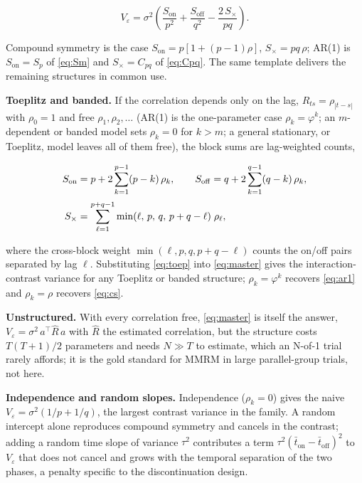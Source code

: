 \documentclass[
  11pt,
]{article}
\begin{document}
\begin{equation}
V_\varepsilon = \sigma^2\!\left(\frac{S_{\mathrm{on}}}{p^2}
  + \frac{S_{\mathrm{off}}}{q^2}
  - \frac{2\, S_{\times}}{pq}\right).
\label{eq:master}
\end{equation}

Compound symmetry is the case \(S_{\mathrm{on}} = p[1 + (p-1)\rho]\),
\(S_{\times} = pq\,\rho\); AR(1) is \(S_{\mathrm{on}} = S_p\) of
\eqref{eq:Sm} and \(S_{\times} = C_{pq}\) of \eqref{eq:Cpq}. The same
template delivers the remaining structures in common use.

\textbf{Toeplitz and banded.} If the correlation depends only on the lag,
\(R_{ts} = \rho_{|t-s|}\) with \(\rho_0 = 1\) and free \(\rho_1, \rho_2,
\dots\) (AR(1) is the one-parameter case \(\rho_k = \varphi^k\); an
\(m\)-dependent or banded model sets \(\rho_k = 0\) for \(k > m\); a general
stationary, or Toeplitz, model leaves all of them free), the block
sums are lag-weighted counts,

\begin{align}
S_{\mathrm{on}} &= p + 2\sum_{k=1}^{p-1}(p-k)\,\rho_k,
\qquad
S_{\mathrm{off}} = q + 2\sum_{k=1}^{q-1}(q-k)\,\rho_k,
\notag\\[2pt]
S_{\times} &= \sum_{\ell=1}^{p+q-1}
   \min(\ell,\, p,\, q,\, p+q-\ell)\;\rho_\ell ,
\label{eq:toep}
\end{align}

where the cross-block weight \(\min(\ell, p, q, p+q-\ell)\) counts the
on/off pairs separated by lag \(\ell\). Substituting \eqref{eq:toep} into
\eqref{eq:master} gives the interaction-contrast variance for any
Toeplitz or banded structure; \(\rho_k = \varphi^k\) recovers
\eqref{eq:ar1} and \(\rho_k = \rho\) recovers \eqref{eq:cs}.

\textbf{Unstructured.} With every correlation free, \eqref{eq:master} is
itself the answer, \(V_\varepsilon = \sigma^2\, a^\top \hat R\, a\) with
\(\hat R\) the estimated correlation, but the structure costs
\(T(T+1)/2\) parameters and needs \(N \gg T\) to estimate, which an
N-of-1 trial rarely affords; it is the gold standard for MMRM in large
parallel-group trials, not here.

\textbf{Independence and random slopes.} Independence (\(\rho_k = 0\)) gives
the naive \(V_\varepsilon = \sigma^2(1/p + 1/q)\), the largest contrast
variance in the family. A random intercept alone reproduces compound
symmetry and cancels in the contrast; adding a random time slope of
variance \(\tau^2\) contributes a term
\(\tau^2(\bar t_{\mathrm{on}} - \bar t_{\mathrm{off}})^2\) to
\(V_\varepsilon\) that does not cancel and grows with the temporal
separation of the two phases, a penalty specific to the
discontinuation design.
\end{document}
